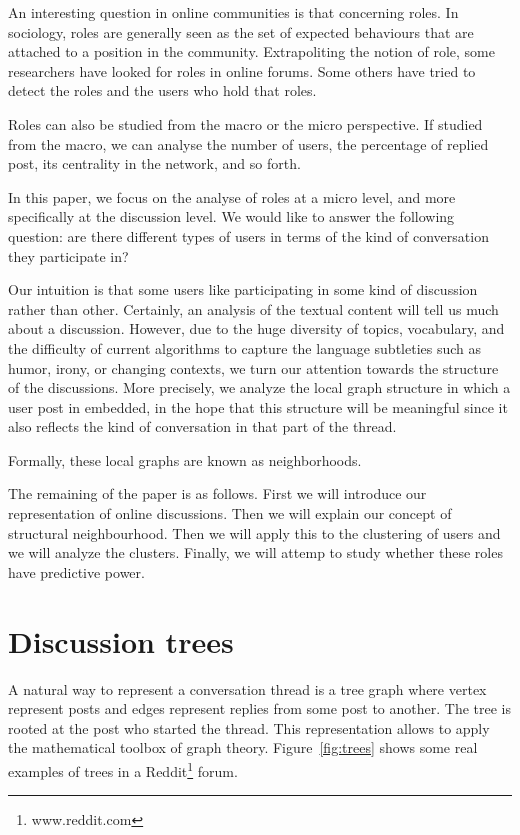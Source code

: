 \documentclass[smallextended]{svjour3}          %
\begin{document}
An interesting question in online communities is that concerning roles. In sociology, roles are generally seen as the set of expected behaviours that are attached  to a position in the community. Extrapoliting the notion of role, some researchers have looked for roles in online forums. Some others have tried to detect the roles and the users who hold that roles.

Roles can also be studied from the macro or the micro perspective. If studied from the macro, we can analyse the number of users, the percentage of replied post, its centrality in the network, and  so forth.

In this paper, we focus on the analyse of roles at a micro level, and more specifically at the discussion level. We would like to answer the following question: are there different types of users in terms of the kind of conversation they participate in?


Our intuition is that some users like participating in some kind of discussion rather than other. Certainly, an analysis of the textual content will tell us much about a discussion. However, due to the huge diversity of topics, vocabulary, and the difficulty of current algorithms to capture the language subtleties such as humor, irony, or changing contexts, we turn our attention towards the structure of the discussions. More precisely, we analyze the local graph structure in which a user post in embedded, in the hope that this structure will be meaningful since it also reflects the kind of conversation in that part of the thread.

Formally, these local graphs are known as neighborhoods.


The remaining of the paper is as follows. First we will introduce our representation of online discussions. Then we will explain our concept of structural neighbourhood. Then we will apply this to the clustering of users and we will analyze the clusters. Finally, we will attemp to study whether these roles have predictive power.


\section{Discussion trees}
A natural way to represent a conversation thread is a tree graph where vertex represent posts and edges represent replies from some post to another. The tree is rooted at the post who started the thread. This representation allows to apply the mathematical toolbox of graph theory. Figure~\ref{fig:trees} shows some real examples of trees in a Reddit\footnote{www.reddit.com} forum.
\end{document}
